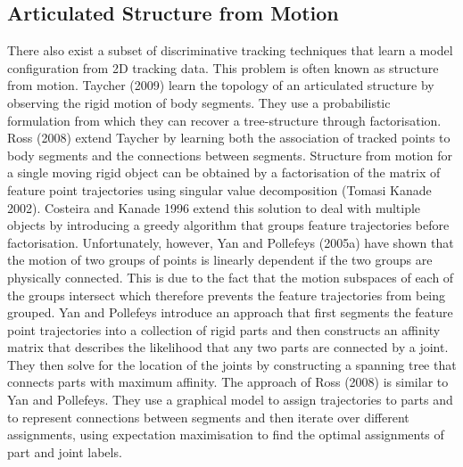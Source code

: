 \subsection {Articulated Structure from Motion}
There also exist a subset of discriminative tracking techniques that learn a model configuration from 2D tracking data. This problem is often known as structure from motion. Taycher (2009) learn the topology of an articulated structure by observing the rigid motion of body segments. They use a probabilistic formulation from which they can recover a tree-structure through factorisation. Ross (2008) extend Taycher by learning both the association of tracked points to body segments and the connections between segments. Structure from motion for a single moving rigid object can be obtained by a factorisation of the matrix of feature point trajectories using singular value decomposition (Tomasi Kanade 2002). Costeira and Kanade 1996 extend this solution to deal with multiple objects by introducing a greedy algorithm that groups feature trajectories before factorisation. Unfortunately, however, Yan and Pollefeys (2005a) have shown that the motion of two groups of points is linearly dependent if the two groups are physically connected. This is due to the fact that the motion subspaces of each of the groups intersect which therefore prevents the feature trajectories from being grouped. Yan and Pollefeys introduce an approach that first segments the feature point trajectories into a collection of rigid parts and then constructs an affinity matrix that describes the likelihood that any two parts are connected by a joint. They then solve for the location of the joints by constructing a spanning tree that connects parts with maximum affinity. The approach of Ross (2008) is similar to Yan and Pollefeys. They use a graphical model to assign trajectories to parts and to represent connections between segments and then iterate over different assignments, using expectation maximisation to find the optimal assignments of part and joint labels.  
























